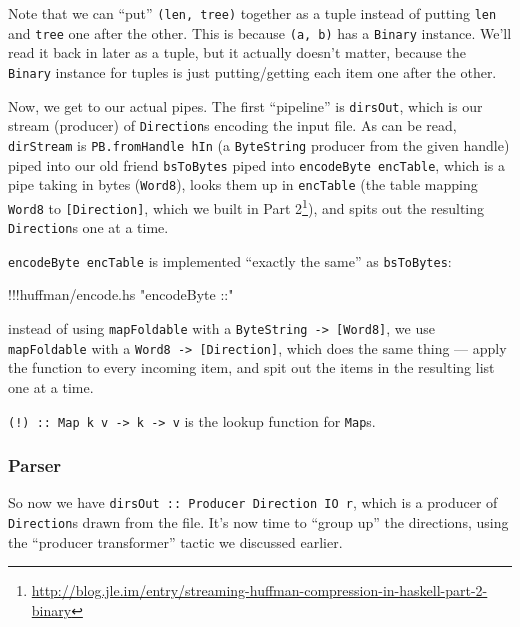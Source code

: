 \documentclass[]{article}
\newenvironment{Shaded}{}{}
\newcommand{\StringTok}[1]{\textcolor[rgb]{0.25,0.44,0.63}{{#1}}}
\newcommand{\FunctionTok}[1]{\textcolor[rgb]{0.02,0.16,0.49}{{#1}}}
\newcommand{\NormalTok}[1]{{#1}}
\renewcommand{\href}[2]{#2\footnote{\url{#1}}}
\begin{document}
Note that we can ``put'' \texttt{(len,\ tree)} together as a tuple
instead of putting \texttt{len} and \texttt{tree} one after the other.
This is because \texttt{(a,\ b)} has a \texttt{Binary} instance. We'll
read it back in later as a tuple, but it actually doesn't matter,
because the \texttt{Binary} instance for tuples is just putting/getting
each item one after the other.

Now, we get to our actual pipes. The first ``pipeline'' is
\texttt{dirsOut}, which is our stream (producer) of \texttt{Direction}s
encoding the input file. As can be read, \texttt{dirStream} is
\texttt{PB.fromHandle\ hIn} (a \texttt{ByteString} producer from the
given handle) piped into our old friend \texttt{bsToBytes} piped into
\texttt{encodeByte\ encTable}, which is a pipe taking in bytes
(\texttt{Word8}), looks them up in \texttt{encTable} (the table mapping
\texttt{Word8} to \texttt{{[}Direction{]}}, which we built in
\href{http://blog.jle.im/entry/streaming-huffman-compression-in-haskell-part-2-binary}{Part
2}), and spits out the resulting \texttt{Direction}s one at a time.

\texttt{encodeByte\ encTable} is implemented ``exactly the same'' as
\texttt{bsToBytes}:

\begin{Shaded}
\begin{Highlighting}[]
\FunctionTok{!!!}\NormalTok{huffman}\FunctionTok{/}\NormalTok{encode}\FunctionTok{.}\NormalTok{hs }\StringTok{"encodeByte ::"}
\end{Highlighting}
\end{Shaded}

instead of using \texttt{mapFoldable} with a
\texttt{ByteString\ -\textgreater{}\ {[}Word8{]}}, we use
\texttt{mapFoldable} with a
\texttt{Word8\ -\textgreater{}\ {[}Direction{]}}, which does the same
thing --- apply the function to every incoming item, and spit out the
items in the resulting list one at a time.

\texttt{(!)\ ::\ Map\ k\ v\ -\textgreater{}\ k\ -\textgreater{}\ v} is
the lookup function for \texttt{Map}s.

\subsubsection{Parser}\label{parser}

So now we have \texttt{dirsOut\ ::\ Producer\ Direction\ IO\ r}, which
is a producer of \texttt{Direction}s drawn from the file. It's now time
to ``group up'' the directions, using the ``producer transformer''
tactic we discussed earlier.
\end{document}
